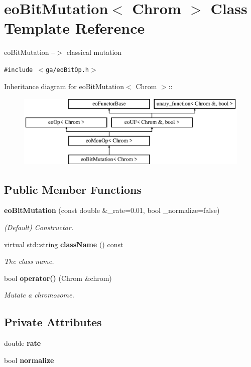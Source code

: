 \section{eo\-Bit\-Mutation$<$ Chrom $>$ Class Template Reference}
\label{classeo_bit_mutation}
eo\-Bit\-Mutation --$>$ classical mutation  


{\tt \#include $<$ga/eo\-Bit\-Op.h$>$}

Inheritance diagram for eo\-Bit\-Mutation$<$ Chrom $>$::\begin{figure}[H]
\begin{center}
\leavevmode
\includegraphics[height=3.50548cm]{classeo_bit_mutation}
\end{center}
\end{figure}
\subsection*{Public Member Functions}
\begin{CompactItemize}
\item 
{\bf eo\-Bit\-Mutation} (const double \&\_\-rate=0.01, bool \_\-normalize=false)
\begin{CompactList}\small\item\em (Default) Constructor. \item\end{CompactList}\item 
virtual std::string {\bf class\-Name} () const \label{classeo_bit_mutation_a1}

\begin{CompactList}\small\item\em The class name. \item\end{CompactList}\item 
bool {\bf operator()} (Chrom \&chrom)
\begin{CompactList}\small\item\em Mutate a chromosome. \item\end{CompactList}\end{CompactItemize}
\subsection*{Private Attributes}
\begin{CompactItemize}
\item 
double {\bf rate}\label{classeo_bit_mutation_r0}

\item 
bool {\bf normalize}\label{classeo_bit_mutation_r1}

\end{CompactItemize}


